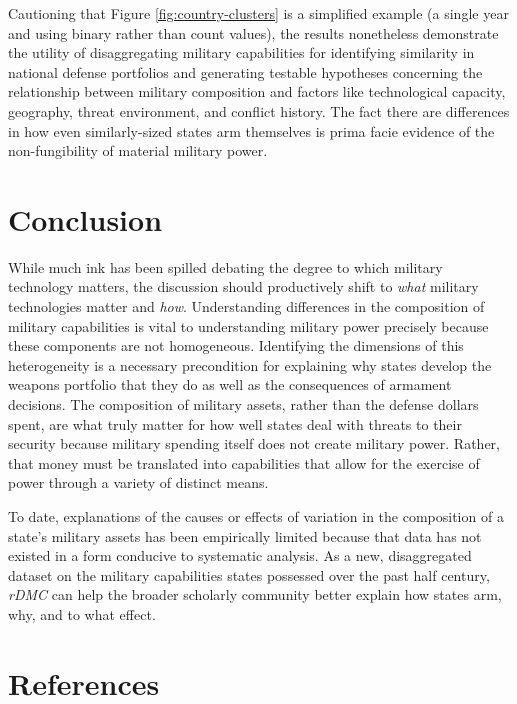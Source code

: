\documentclass[
]{article}
\begin{document}
Cautioning that Figure \ref{fig:country-clusters} is a simplified example (a single year and using binary rather than count values), the results nonetheless demonstrate the utility of disaggregating military capabilities for identifying similarity in national defense portfolios and generating testable hypotheses concerning the relationship between military composition and factors like technological capacity, geography, threat environment, and conflict history. The fact there are differences in how even similarly-sized states arm themselves is prima facie evidence of the non-fungibility of material military power.

\hypertarget{conclusion}{%
\section{Conclusion}\label{conclusion}}

While much ink has been spilled debating the degree to which military technology matters, the discussion should productively shift to \emph{what} military technologies matter and \emph{how}. Understanding differences in the composition of military capabilities is vital to understanding military power precisely because these components are not homogeneous. Identifying the dimensions of this heterogeneity is a necessary precondition for explaining why states develop the weapons portfolio that they do as well as the consequences of armament decisions. The composition of military assets, rather than the defense dollars spent, are what truly matter for how well states deal with threats to their security because military spending itself does not create military power. Rather, that money must be translated into capabilities that allow for the exercise of power through a variety of distinct means.

To date, explanations of the causes or effects of variation in the composition of a state's military assets has been empirically limited because that data has not existed in a form conducive to systematic analysis. As a new, disaggregated dataset on the military capabilities states possessed over the past half century, \emph{rDMC} can help the broader scholarly community better explain how states arm, why, and to what effect.

\newpage

\hypertarget{references}{%
\section*{References}\label{references}}
\end{document}
